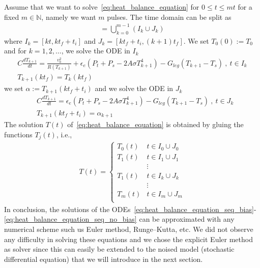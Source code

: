 Assume that we want to solve~\eqref{eq:heat_balance_equation} for $0 \le t \le m t$ for a fixed $m \in \mathbb{N}$, namely we want $m$ pulses. The time domain can be split as
\begin{align*}
 [0, m t_f] = \bigcup_{k=0}^{m-1} (I_k \cup J_k)
\end{align*} 
where $I_k=[k t, k t_f+t_i]$ and $J_k = [k t_f + t_i, (k+1)t_f]$. 
We set $T_0(0):=T_0$ and for $k=1, 2, \dots$, we solve the ODE in $I_k$
\begin{align} \label{eq:heat_balance_equation_seq_bias}
& C\frac{dT_{k+1}}{dt}=\frac{v_b^2}{R(T_{k+1})}+\epsilon_e(P_t+P_s -2A\sigma T_{k+1}^4)-G_{leg}(T_{k+1}-T_s) \ , \ t \in I_k \nonumber \\
& T_{k+1}(kt_f)=T_{k}(kt_f)&
\end{align}
we set $\alpha:=T_{k+1}(kt_f+t_i)$ and we solve the ODE in $J_k$
\begin{align} \label{eq:heat_balance_equation_seq_no_bias}
& C\frac{dT_{k+1}}{dt}=\epsilon_e(P_t+P_s -2A\sigma T_{k+1}^4)-G_{leg}(T_{k+1}-T_s) \ , \ t \in J_k \nonumber \\
&T_{k+1}(kt_f+t_i)=\alpha_{k+1}	
\end{align}
The solution $T(t)$ of~\eqref{eq:heat_balance_equation} is obtained by gluing the functions $T_j(t)$, i.e., 
\begin{align*}
 T(t) = 
 \begin{cases}
  T_0(t) & t \in I_0 \cup J_0	\\
  T_1(t) & t \in I_1 \cup J_1	\\
	 & \vdots 		\\
  T_1(t) & t \in I_k \cup J_k	\\
	 & \vdots		\\
  T_m(t) & t \in I_m \cup J_m	\\
 \end{cases}
\end{align*}
In conclusion, the solutions of the ODEs~\eqref{eq:heat_balance_equation_seq_bias}-\eqref{eq:heat_balance_equation_seq_no_bias} can be approximated with any numerical scheme such us Euler method, Runge--Kutta, etc. We did not observe any difficulty in solving these equations and we chose the explicit Euler method as solver since this can easily be extended to the noised model (stochastic differential equation) that we will introduce in the next section.  


